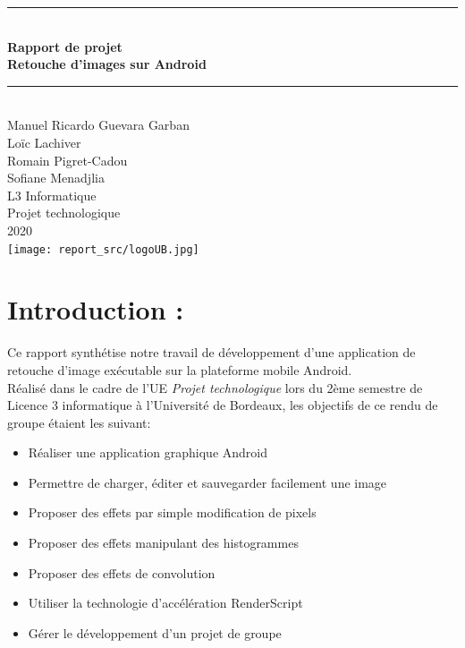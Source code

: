 \documentclass[12pt, a4paper]{article}
\begin{document}
\begin{titlepage}
  \begin{center}

    \rule{\linewidth}{0.5mm} \\[0.4cm]
    { \huge \bfseries {\LARGE{Rapport de projet}}
    \\Retouche d'images sur Android\\[0.4cm] }
    \rule{\linewidth}{0.5mm} \\[1.5cm]
    
    {\Large {
      Manuel Ricardo Guevara Garban\\
      Loïc Lachiver\\
      Romain Pigret-Cadou\\
      Sofiane Menadjlia
    }}\\[1.5cm]
    {\LARGE L3 Informatique}\\[0.5cm]
    
    {\Large Projet technologique}\\[0.5cm]
    {\Large 2020}\\[1.5cm]
    
    \texttt{[image: report\_src/logoUB.jpg]}
    
    
  \end{center}
\end{titlepage}



\tableofcontents
\clearpage 


\section{Introduction :} \label{intro}
Ce rapport synthétise notre travail de développement d'une application de retouche d'image exécutable sur la plateforme mobile Android.
\\
Réalisé dans le cadre de l'UE \textit{Projet technologique} lors du 2ème semestre de Licence 3 informatique à l'Université de Bordeaux, les objectifs de ce rendu de groupe étaient les suivant:
\begin{itemize} [label=\textbullet]
  \item Réaliser une application graphique Android
  \item Permettre de charger, éditer et sauvegarder facilement une image
  \item Proposer des effets par simple modification de pixels
  \item Proposer des effets manipulant des histogrammes
  \item Proposer des effets de convolution
  \item Utiliser la technologie d'accélération RenderScript
  \item Gérer le développement d'un projet de groupe
\end{itemize}
\end{document}
